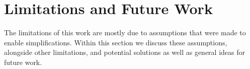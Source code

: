 \section{Limitations and Future Work}
The limitations of this work are mostly due to assumptions that were made to enable simplifications. Within this section we discuss these assumptions, alongside other limitations, and potential solutions as well as general ideas for future work.


